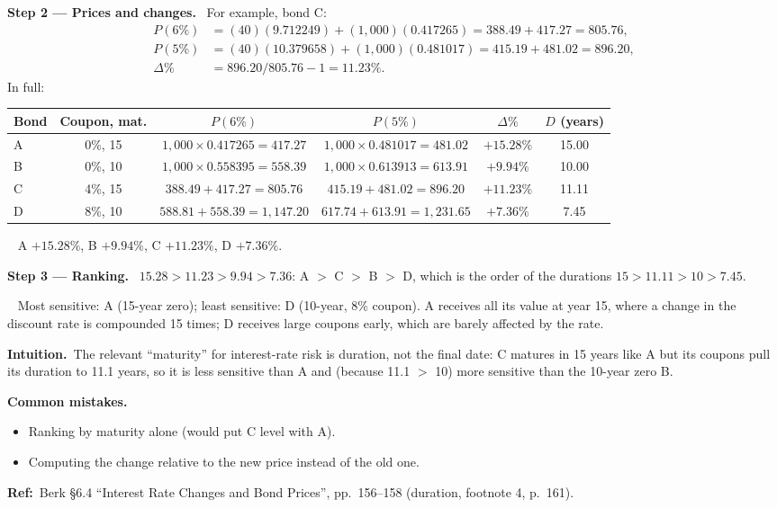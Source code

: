 \documentclass[11pt,a4paper]{article}
\newcommand{\step}[2]{\par\medskip\noindent\textbf{Step #1 --- #2.}~}
\newcommand{\intuition}{\par\medskip\noindent\textbf{Intuition.}~}
\newcommand{\refbib}{\par\smallskip\noindent\textbf{Ref:}~}
\newcommand{\answer}[1]{\par\smallskip\noindent\fbox{\textbf{Answer #1.}}~}
\newcommand{\pitfalls}{\par\medskip\noindent\textbf{Common mistakes.}}
\begin{document}
\step{2}{Prices and changes} For example, bond C:
\begin{align}
  P(6\%) &= (40)(9.712249)+(1{,}000)(0.417265) = 388.49+417.27 = 805.76, \nonumber\\
  P(5\%) &= (40)(10.379658)+(1{,}000)(0.481017) = 415.19+481.02 = 896.20, \nonumber\\
  \Delta\% &= 896.20/805.76-1 = 11.23\%. \label{r2be11-C}
\end{align}
In full:
\begin{center}\small\setlength{\tabcolsep}{4pt}
\begin{tabular}{@{}lccccc@{}}\toprule
Bond & Coupon, mat. & $P(6\%)$ & $P(5\%)$ & $\Delta\%$ & $D$ (years)\\\midrule
A & 0\%, 15 & $1{,}000\times0.417265=417.27$ & $1{,}000\times0.481017=481.02$ & $+15.28\%$ & 15.00\\
B & 0\%, 10 & $1{,}000\times0.558395=558.39$ & $1{,}000\times0.613913=613.91$ & $+9.94\%$ & 10.00\\
C & 4\%, 15 & $388.49+417.27=805.76$ & $415.19+481.02=896.20$ & $+11.23\%$ & 11.11\\
D & 8\%, 10 & $588.81+558.39=1{,}147.20$ & $617.74+613.91=1{,}231.65$ & $+7.36\%$ & 7.45\\\bottomrule
\end{tabular}
\end{center}
\answer{(21)} A $+15.28\%$, B $+9.94\%$, C $+11.23\%$, D $+7.36\%$.

\step{3}{Ranking} $15.28>11.23>9.94>7.36$: A $>$ C $>$ B $>$ D, which is the order of the durations $15>11.11>10>7.45$.
\answer{(22)} Most sensitive: A (15-year zero); least sensitive: D (10-year, 8\% coupon). A receives all its value at year 15,
where a change in the discount rate is compounded 15 times; D receives large coupons early, which are barely affected by the rate.

\intuition The relevant ``maturity'' for interest-rate risk is duration, not the final date: C matures in 15 years like A but its
coupons pull its duration to 11.1 years, so it is less sensitive than A and (because 11.1 $>$ 10) more sensitive than the 10-year zero B.
\pitfalls
\begin{itemize}
  \item Ranking by maturity alone (would put C level with A).
  \item Computing the change relative to the new price instead of the old one.
\end{itemize}
\refbib{Berk \S6.4 ``Interest Rate Changes and Bond Prices'', pp.~156--158 (duration, footnote 4, p.~161).}
\end{document}
